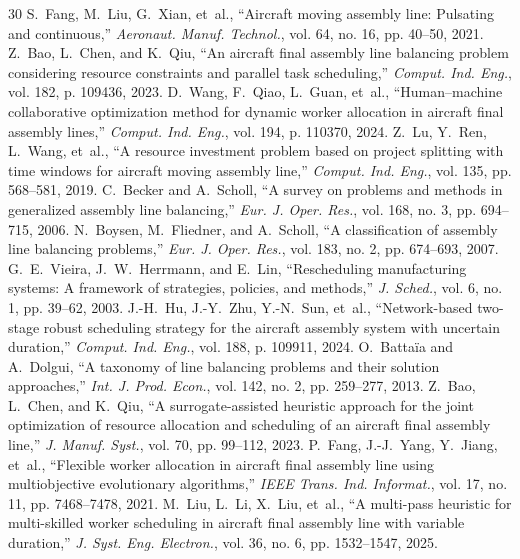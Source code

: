 \documentclass[journal,10pt]{IEEEtran}
\begin{document}
\begin{thebibliography}{30}
S.~Fang, M.~Liu, G.~Xian, et~al., ``Aircraft moving assembly line: Pulsating and continuous,'' \textit{Aeronaut. Manuf. Technol.}, vol. 64, no. 16, pp. 40--50, 2021.
Z.~Bao, L.~Chen, and K.~Qiu, ``An aircraft final assembly line balancing problem considering resource constraints and parallel task scheduling,'' \textit{Comput. Ind. Eng.}, vol. 182, p. 109436, 2023.
D.~Wang, F.~Qiao, L.~Guan, et~al., ``Human--machine collaborative optimization method for dynamic worker allocation in aircraft final assembly lines,'' \textit{Comput. Ind. Eng.}, vol. 194, p. 110370, 2024.
Z.~Lu, Y.~Ren, L.~Wang, et~al., ``A resource investment problem based on project splitting with time windows for aircraft moving assembly line,'' \textit{Comput. Ind. Eng.}, vol. 135, pp. 568--581, 2019.
C.~Becker and A.~Scholl, ``A survey on problems and methods in generalized assembly line balancing,'' \textit{Eur. J. Oper. Res.}, vol. 168, no. 3, pp. 694--715, 2006.
N.~Boysen, M.~Fliedner, and A.~Scholl, ``A classification of assembly line balancing problems,'' \textit{Eur. J. Oper. Res.}, vol. 183, no. 2, pp. 674--693, 2007.
G.~E.~Vieira, J.~W.~Herrmann, and E.~Lin, ``Rescheduling manufacturing systems: A framework of strategies, policies, and methods,'' \textit{J. Sched.}, vol. 6, no. 1, pp. 39--62, 2003.
J.-H.~Hu, J.-Y.~Zhu, Y.-N.~Sun, et~al., ``Network-based two-stage robust scheduling strategy for the aircraft assembly system with uncertain duration,'' \textit{Comput. Ind. Eng.}, vol. 188, p. 109911, 2024.
O.~Batta\"ia and A.~Dolgui, ``A taxonomy of line balancing problems and their solution approaches,'' \textit{Int. J. Prod. Econ.}, vol. 142, no. 2, pp. 259--277, 2013.
Z.~Bao, L.~Chen, and K.~Qiu, ``A surrogate-assisted heuristic approach for the joint optimization of resource allocation and scheduling of an aircraft final assembly line,'' \textit{J. Manuf. Syst.}, vol. 70, pp. 99--112, 2023.
P.~Fang, J.-J.~Yang, Y.~Jiang, et~al., ``Flexible worker allocation in aircraft final assembly line using multiobjective evolutionary algorithms,'' \textit{IEEE Trans. Ind. Informat.}, vol. 17, no. 11, pp. 7468--7478, 2021.
M.~Liu, L.~Li, X.~Liu, et~al., ``A multi-pass heuristic for multi-skilled worker scheduling in aircraft final assembly line with variable duration,'' \textit{J. Syst. Eng. Electron.}, vol. 36, no. 6, pp. 1532--1547, 2025.

\end{thebibliography}
\end{document}
